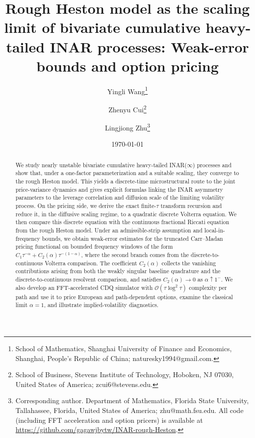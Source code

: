 \documentclass[letterpaper]{article}
\numberwithin{equation}{section}
\theoremstyle{definition}
\theoremstyle{remark}
\begin{document}
\title{Rough Heston model as the scaling limit of bivariate cumulative heavy-tailed INAR processes: Weak-error bounds and option pricing
}

\author{%
Yingli Wang\thanks{School of Mathematics, Shanghai University of Finance and Economics, Shanghai, People's Republic of China; naturesky1994@gmail.com.}%
\and
Zhenyu Cui\thanks{School of Business, Stevens Institute of Technology, Hoboken, NJ 07030, United States of America; zcui6@stevens.edu.}
\and
Lingjiong Zhu\thanks{Corresponding author.  Department of Mathematics, Florida State University, Tallahassee, Florida, United States of America; zhu@math.fsu.edu. All code (including FFT acceleration and option pricers) is available at \protect\url{https://github.com/gagawjbytw/INAR-rough-Heston}.}%
}

\date{\today}

\maketitle


\begin{abstract}
We study nearly unstable bivariate cumulative heavy-tailed INAR($\infty$) processes and show that, under a one-factor parameterization and a suitable scaling, they converge to the rough Heston model. This yields a discrete-time microstructural route to the joint price-variance dynamics and gives explicit formulas linking the INAR asymmetry parameters to the leverage correlation and diffusion scale of the limiting volatility process.
On the pricing side, we derive the exact finite-$\tau$ transform recursion and reduce it, in the diffusive scaling regime, to a quadratic discrete Volterra equation. We then compare this discrete equation with the continuous fractional Riccati equation from the rough Heston model. Under an admissible-strip assumption and local-in-frequency bounds, we obtain weak-error estimates for the truncated Carr--Madan pricing functional on bounded frequency windows of the form $C_1\tau^{-\alpha}+C_2(\alpha)\tau^{-(1-\alpha)}$, where the second branch comes from the discrete-to-continuous Volterra comparison. The coefficient $C_2(\alpha)$ collects the vanishing contributions arising from both the weakly singular baseline quadrature and the discrete-to-continuous resolvent comparison, and satisfies $C_2(\alpha)\to0$ as $\alpha\uparrow1^-$. 
We also develop an FFT-accelerated CDQ simulator with $\mathcal O(\tau\log^2\tau)$ complexity per path and use it to price European and path-dependent options, examine the classical limit $\alpha=1$, and illustrate implied-volatility diagnostics.
\end{abstract}
\end{document}
